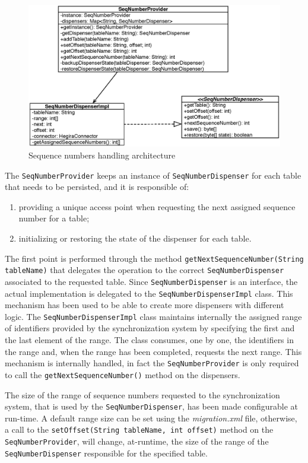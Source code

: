 \begin{figure}[tbh]
  \centering
  \includegraphics[width=12cm]{images/seq_provider}
  \caption{Sequence numbers handling architecture}
  \label{fig:seq-provider}
\end{figure} 

\noindent The \texttt{SeqNumberProvider} keeps an instance of \texttt{SeqNumberDispenser} for each table that needs to be persisted, and it is responsible of:
\begin{enumerate}
\item providing a unique access point when requesting the next assigned sequence number for a table;
\item initializing or restoring the state of the dispenser for each table.
\end{enumerate}
\noindent The first point is performed through the method \texttt{getNextSequenceNumber(String tableName)} that delegates the operation to the correct \texttt{SeqNumberDispenser} associated to the requested table.
Since \texttt{SeqNumberDispenser} is an interface, the actual implementation is delegated to the \texttt{SeqNumberDispenserImpl} class. This mechanism has been used to be able to create more dispensers with different logic.
\noindent The \texttt{SeqNumberDispenserImpl} class maintains internally the assigned range of identifiers provided by the synchronization system by specifying the first and the last element of the range. The class consumes, one by one, the identifiers in the range and, when the range has been completed, requests the next range. This mechanism is internally handled, in fact the \texttt{SeqNumberProvider} is only required to call the \texttt{getNextSequenceNumber()} method on the dispensers.

\noindent The size of the range of sequence numbers requested to the synchronization system, that is used by the \texttt{SeqNumberDispenser}, has been made configurable at run-time. A default range size can be set using the \textit{migration.xml} file, otherwise, a call to the \texttt{setOffset(String tableName, int offset)} method on the \texttt{SeqNumberProvider}, will change, at-runtime, the size of the range of the \texttt{SeqNumberDispenser} responsible for the specified table.

